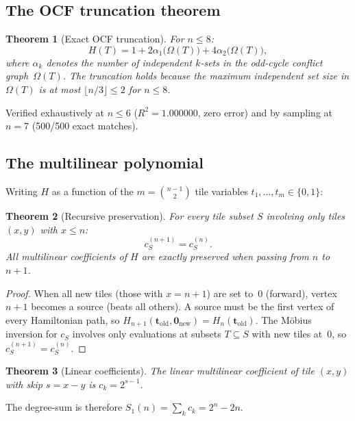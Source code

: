 \documentclass[12pt,reqno]{amsart}
\theoremstyle{plain}
\newtheorem{theorem}{Theorem}[section]
\theoremstyle{definition}
\theoremstyle{remark}
\begin{document}
\subsection{The OCF truncation theorem}

\begin{theorem}[Exact OCF truncation]\label{thm:ocf_trunc}
For $n \leq 8$:
\[
  H(T) = 1 + 2\alpha_1\bigl(\Omega(T)\bigr) + 4\alpha_2\bigl(\Omega(T)\bigr),
\]
where $\alpha_k$ denotes the number of independent $k$-sets in the odd-cycle conflict graph~$\Omega(T)$.
The truncation holds because the maximum independent set size in $\Omega(T)$ is at most $\lfloor n/3 \rfloor \leq 2$ for $n \leq 8$.
\end{theorem}

\noindent Verified exhaustively at $n \leq 6$ ($R^2 = 1.000000$, zero error) and by sampling at $n = 7$ (500/500 exact matches).

\subsection{The multilinear polynomial}

Writing $H$ as a function of the $m = \binom{n-1}{2}$ tile variables $t_1, \ldots, t_m \in \{0,1\}$:

\begin{theorem}[Recursive preservation]\label{thm:recursive_pres}
For every tile subset $S$ involving only tiles $(x,y)$ with $x \leq n$:
\[
  c_S^{(n+1)} = c_S^{(n)}.
\]
All multilinear coefficients of $H$ are exactly preserved when passing from $n$ to $n{+}1$.
\end{theorem}

\begin{proof}
When all new tiles (those with $x = n{+}1$) are set to~$0$ (forward), vertex $n{+}1$ becomes a source (beats all others). A source must be the first vertex of every Hamiltonian path, so $H_{n+1}(\mathbf{t}_{\mathrm{old}}, \mathbf{0}_{\mathrm{new}}) = H_n(\mathbf{t}_{\mathrm{old}})$.
The M\"obius inversion for $c_S$ involves only evaluations at subsets $T \subseteq S$ with new tiles at~$0$, so $c_S^{(n+1)} = c_S^{(n)}$.
\end{proof}

\begin{theorem}[Linear coefficients]\label{thm:linear_coeff}
The linear multilinear coefficient of tile $(x,y)$ with skip $s = x - y$ is $c_k = 2^{s-1}$.
\end{theorem}

\noindent The degree-sum is therefore $S_1(n) = \sum_k c_k = 2^n - 2n$.
\end{document}
